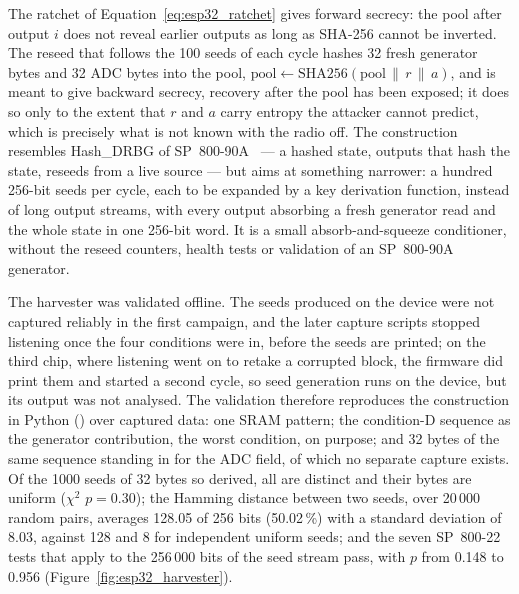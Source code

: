 The ratchet of Equation~\eqref{eq:esp32_ratchet} gives forward secrecy:
the pool after output $i$ does not reveal earlier outputs as long as
SHA-256 cannot be inverted. The reseed that follows the 100 seeds of each
cycle hashes 32 fresh generator bytes and 32 ADC bytes into the pool,
$\mathrm{pool} \leftarrow \mathrm{SHA256}(\mathrm{pool} \,\|\, r \,\|\, a)$,
and is meant to give backward secrecy, recovery after the pool has been
exposed; it does so only to the extent that $r$ and $a$ carry entropy the
attacker cannot predict, which is precisely what is not known with the
radio off. The construction resembles Hash\_DRBG of
SP~800-90A~\cite{barker_2015_sp80090ar1} --- a hashed state, outputs that
hash the state, reseeds from a live source --- but aims at something
narrower: a hundred 256-bit seeds per cycle, each to be expanded by a key
derivation function, instead of long output streams, with every output
absorbing a fresh generator read and the whole state in one 256-bit
word. It is a small absorb-and-squeeze conditioner, without the reseed
counters, health tests or validation of an SP~800-90A generator.

The harvester was validated offline. The seeds produced on the device
were not captured reliably in the first campaign, and the later capture
scripts stopped listening once the four conditions were in, before the
seeds are printed; on the third chip, where listening went on to retake
a corrupted block, the firmware did print them and started a second
cycle, so seed generation runs on the device, but its output was not
analysed. The validation
therefore reproduces the construction in Python
() over captured data:
one SRAM pattern; the condition-D sequence as the generator contribution,
the worst condition, on purpose; and 32 bytes of the same sequence
standing in for the ADC field, of which no separate capture exists. Of the
1000 seeds of 32 bytes so derived, all are distinct and their bytes are
uniform ($\chi^2$ $p = 0.30$); the Hamming distance between two seeds,
over 20\,000 random pairs, averages 128.05 of 256 bits (50.02\,\%) with a
standard deviation of 8.03, against 128 and 8 for independent uniform
seeds; and the seven SP~800-22 tests that apply to the 256\,000 bits of
the seed stream pass, with $p$ from 0.148 to 0.956
(Figure~\ref{fig:esp32_harvester}).

